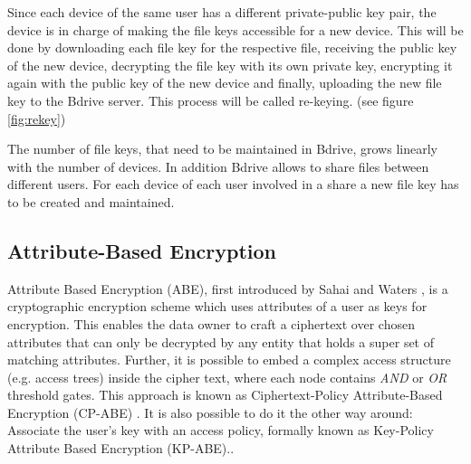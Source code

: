 \documentclass[twocolumn]{article}
\begin{document}
Since each device of the same user has a different private-public key pair, the device is in charge of making the file keys accessible for a new device. This will be done by downloading each file key for the respective file, receiving the public key of the new device, decrypting the file key with its own private key, encrypting it again with the public key of the new device and finally, uploading the new file key to the Bdrive server. This process will be called re-keying. (see figure \ref{fig:rekey})

The number of file keys, that need to be maintained in Bdrive, grows linearly with the number of devices. In addition Bdrive allows to share files between different users. For each device of each user involved in a share a new file key has to be created and maintained. 




\subsection{Attribute-Based Encryption}
Attribute Based Encryption (ABE), first introduced by Sahai and Waters \cite{sahai2005fuzzy}, is a cryptographic encryption scheme which uses attributes of a user as keys for encryption. This enables the data owner to craft a ciphertext over chosen attributes that can only be decrypted by any entity that holds a super set of matching attributes. Further, it is possible to embed a complex access structure (e.g. access trees) inside the cipher text, where each node contains \textit{AND} or \textit{OR} threshold gates. This approach is known as Ciphertext-Policy Attribute-Based Encryption (CP-ABE) \cite{bethencourt2007ciphertext}. 
It is also possible to do it the other way around: Associate the user's key with an access policy, formally known as Key-Policy Attribute Based Encryption (KP-ABE).\cite{goyal2006attribute}. 
\end{document}
